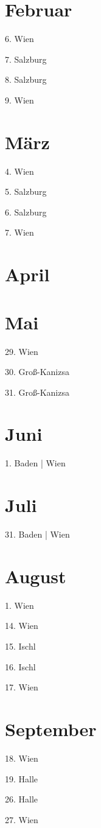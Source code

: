 \documentclass[twoside=false,titlepage=false,open=any, parskip=never, fontsize=10pt, headings=small, chapterprefix=false, appendixprefix=false, DIV=15]{scrbook}
\begin{document}
\begin{multicols}{3}
            \section*{Februar}
            6. Wien\par
            7. Salzburg\par
            8. Salzburg\par
            9. Wien\par
            \section*{März}
            4. Wien\par
            5. Salzburg\par
            6. Salzburg\par
            7. Wien\par
            \section*{April}
            \section*{Mai}
            29. Wien\par
            30. Groß-Kanizsa\par
            31. Groß-Kanizsa\par
            \section*{Juni}
            1. Baden | Wien\par
            \section*{Juli}
            31. Baden | Wien\par
            \section*{August}
            1. Wien\par
            14. Wien\par
            15. Ischl\par
            16. Ischl\par
            17. Wien\par
            \section*{September}
            18. Wien\par
            19. Halle\par
            26. Halle\par
            27. Wien\par

\end{multicols}
\end{document}
